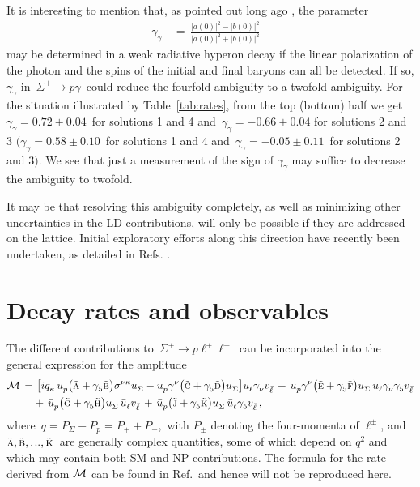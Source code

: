 \documentclass[amsmath,amssymb,aps,nofootinbib,prd,preprint,superscriptaddress,tightenlines,a4paper,bm]{revtex4-2}
\begin{document}
It is interesting to mention that, as pointed out long ago \cite{Behrends:1958zz}, the parameter
\begin{align}
\gamma_\gamma & \,=\, \frac{|a(0)|^{2}-|b(0)|^{2} }{|a(0)|^{2}+|b(0)|^{2}} &
\end{align}
may be determined in a weak radiative hyperon decay if the linear polarization of the photon and the spins of the initial and final baryons can all be detected.
If so, $\gamma_\gamma$ in \,$\Sigma^+\to p\gamma$\, could reduce the fourfold ambiguity to a twofold ambiguity.
For the situation illustrated by Table~\ref{tab:rates}, from the top (bottom) half we get \,$\gamma_\gamma=0.72\pm0.04$\, for solutions 1 and 4 and \,$\gamma_\gamma=-0.66\pm0.04$  for solutions 2 and 3 $\big(\gamma_\gamma=0.58\pm0.10$\, for solutions 1 and 4 and \,$\gamma_\gamma=-0.05\pm0.11$\, for solutions 2 and 3$\big)$.
We see that just a measurement of the sign of $\gamma_\gamma$ may suffice to decrease the ambiguity to twofold.

It may be that resolving this ambiguity completely, as well as minimizing other uncertainties in the LD contributions, will only be possible if they are addressed on the lattice.
Initial exploratory efforts along this direction have recently been undertaken, as detailed in Refs.\,\,\cite{Erben:2022tdu,Erben:2022igb}.

\section{Decay rates and observables\label{rates}}

The different contributions to \,$\Sigma^+\to p\ell^+\ell^-$\, can be  incorporated into the general expression for the amplitude~\cite{He:2018yzu}
\begin{align} \label{MtotS2pll}
{\cal M} \,= &~ \bigl[ i q_\kappa^{}\, \bar u_p^{} \big( \tilde{\textsc a}
+ \gamma_5^{} \tilde{\textsc b} \big) \sigma^{\nu\kappa} u_\Sigma^{}
- \bar u_p^{}\gamma^\nu \big(\tilde{\textsc c}+\gamma_5^{}\tilde{\textsc d}
\big) u_\Sigma^{} \bigr] \bar u_\ell^{}\gamma_\nu^{} v_{\bar\ell}^{}
\,+\, \bar u_p^{}\gamma^\nu \big(\tilde{\textsc e}+\gamma_5^{}\tilde{\textsc f}
\big) u_\Sigma^{}\, \bar u_\ell^{} \gamma_\nu^{} \gamma_5^{} v_{\bar\ell}^{}
\nonumber \\ & +\,
\bar u_p^{}\big(\tilde{\textsc g}+\gamma_5^{}\tilde{\textsc h}\big)u_\Sigma^{}\,
\bar u_\ell^{}v_{\bar\ell}^{}
\,+\, \bar u_p^{}\big(\tilde{\textsc j}+\gamma_5^{}\tilde{\textsc k}\big)u_\Sigma^{}\,
\bar u_\ell^{}\gamma_5^{}v_{\bar\ell}^{} \,,
\end{align}
%
where \,$q=P_\Sigma^{}-P_p=P_+^{}+P_-^{}$,\, with $P_\pm^{}$ denoting the four-momenta of $\ell^\pm$, and \,$\tilde{\textsc a},\tilde{\textsc b},.$..$,\tilde{\textsc k}$\, are generally complex quantities, some of which depend on $q^2$ and which may contain both SM and NP contributions.
The formula for the rate derived from $\cal M$ can be found in Ref.\,\cite{He:2018yzu} and hence will not be reproduced here.
\end{document}

